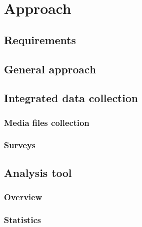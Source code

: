 
\chapter{Approach}\label{chapter:approach}

\section{Requirements}

\section{General approach}

\section{Integrated data collection}\label{section:integrated_data_collection}

\subsection{Media files collection} \label{subsec:media_files}

\subsection{Surveys}\label{subsec:surveys}


\section{Analysis tool} \label{section:analysis_tool}

\subsection{Overview}

\subsection{Statistics}



